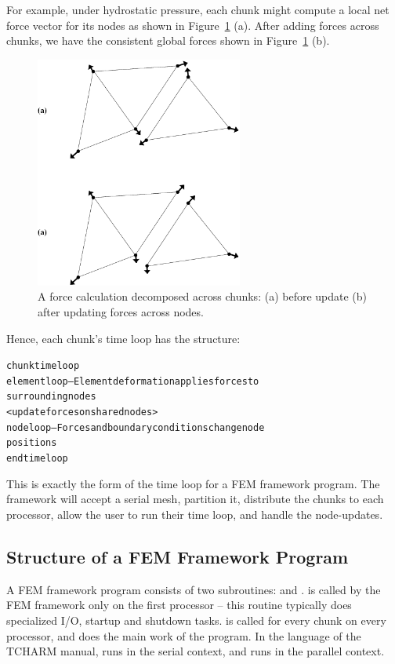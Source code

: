 \documentclass[10pt]{article}
\begin{document}
For example, under hydrostatic pressure, each chunk might compute a local
net force vector for its nodes as shown in Figure~\ref{fig:forcedecomp}
(a).  After adding forces across chunks, we have the consistent global forces
shown in Figure~\ref{fig:forcedecomp} (b).

\begin{figure}[h]
\begin{center}
\includegraphics[height=3in]{fig/forcedecomp}
\end{center}
\caption{A force calculation decomposed across chunks: (a) before update
(b) after updating forces across nodes.}
\label{fig:forcedecomp}
\end{figure}

Hence, each chunk's time loop has the structure:

\begin{alltt}
     chunk time loop
          element loop-- Element deformation applies forces to
          surrounding nodes
          <update forces on shared nodes>
          node loop-- Forces and boundary conditions change node
          positions
     end time loop
\end{alltt}

This is exactly the form of the time loop for a \charmpp{} FEM framework
program.  The framework will accept a serial mesh, partition it, distribute
the chunks to each processor, allow the user to run their time loop, and
handle the node-updates.


\subsection{Structure of a FEM Framework Program}

A FEM framework program consists of two subroutines:  and .
 is called by the FEM framework
only on the first processor -- this routine typically does specialized I/O,
startup and shutdown tasks.   is called for every chunk on every
processor, and does the main work of the program.  In the language of the
TCHARM manual,  runs in the serial context, 
and  runs in the parallel context.
\end{document}
